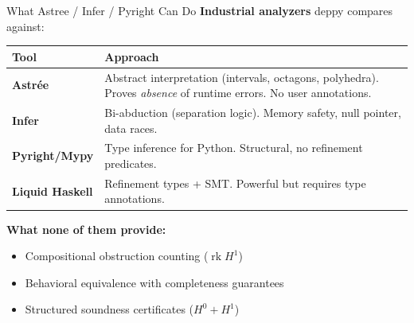 \documentclass[aspectratio=169,10pt]{beamer}
\newcommand{\rk}{\operatorname{rk}}
\begin{document}
\begin{frame}{What Astree / Infer / Pyright Can Do}
\textbf{Industrial analyzers} deppy compares against:

\vspace{0.3em}
\renewcommand{\arraystretch}{1.3}
\begin{tabular}{@{}lp{8cm}@{}}
\toprule
\textbf{Tool} & \textbf{Approach} \\
\midrule
\textbf{Astr\'ee} & Abstract interpretation (intervals, octagons, polyhedra). Proves \emph{absence} of runtime errors. No user annotations. \\
\textbf{Infer} & Bi-abduction (separation logic). Memory safety, null pointer, data races. \\
\textbf{Pyright/Mypy} & Type inference for Python. Structural, no refinement predicates. \\
\textbf{Liquid Haskell} & Refinement types + SMT. Powerful but requires type annotations. \\
\bottomrule
\end{tabular}

\vspace{0.3em}
\textbf{What none of them provide:}
\begin{itemize}
  \item Compositional obstruction counting ($\rk H^1$)
  \item Behavioral equivalence with completeness guarantees
  \item Structured soundness certificates ($H^0 + H^1$)
\end{itemize}
\end{frame}
\end{document}
